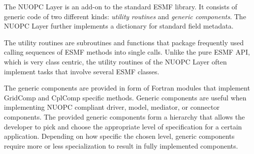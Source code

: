 %
The NUOPC Layer is an add-on to the standard ESMF library. It consists of generic code of two different kinds: {\em utility routines} and {\em generic components}. The NUOPC Layer further implements a dictionary for standard field metadata.

The utility routines are subroutines and functions that package frequently used calling sequences of ESMF methods into single calls. Unlike the pure ESMF API, which is very class centric, the utility routines of the NUOPC Layer often implement tasks that involve several ESMF classes.

The generic components are provided in form of Fortran modules that implement GridComp and CplComp specific methods. Generic components are useful when implementing NUOPC compliant driver, model, mediator, or connector components. The provided generic components form a hierarchy that allows the developer to pick and choose the appropriate level of specification for a certain application. Depending on how specific the chosen level, generic components require more or less specialization to result in fully implemented components.

